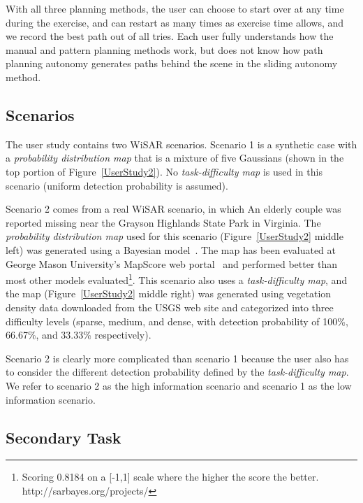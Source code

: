 With all three planning methods, the user can choose to start over at any time during the exercise, and can restart as many times as exercise time allows, and we record the best path out of all tries. Each user fully understands how the manual and pattern planning methods work, but does not know how path planning autonomy generates paths behind the scene in the sliding autonomy method.

\subsection{Scenarios}

The user study contains two WiSAR scenarios. Scenario 1 is a synthetic case with a \textit{probability distribution map} that is a mixture of five Gaussians (shown in the top portion of Figure~\ref{UserStudy2}). No \textit{task-difficulty map} is used in this scenario (uniform detection probability is assumed). 

Scenario 2 comes from a real WiSAR scenario, in which An elderly couple was reported missing near the Grayson Highlands State Park in Virginia. The \textit{probability distribution map} used for this scenario (Figure~\ref{UserStudy2} middle left) was generated using a Bayesian model~\cite{Lin2010Bayesian}. The map has been evaluated at George Mason University's MapScore web portal~\cite{Twardy2012MapScore} and performed better than most other models evaluated\footnote{Scoring 0.8184 on a [-1,1] scale where the higher the score the better. http://sarbayes.org/projects/}. This scenario also uses a \textit{task-difficulty map}, and the map (Figure~\ref{UserStudy2} middle right) was generated using vegetation density data downloaded from the USGS web site and categorized into three difficulty levels (sparse, medium, and dense, with detection probability of 100\%, 66.67\%, and 33.33\% respectively).

Scenario 2 is clearly more complicated than scenario 1 because the user also has to consider the different detection probability defined by the \textit{task-difficulty map}. We refer to scenario 2 as the high information scenario and scenario 1 as the low information scenario.

\subsection{Secondary Task}

